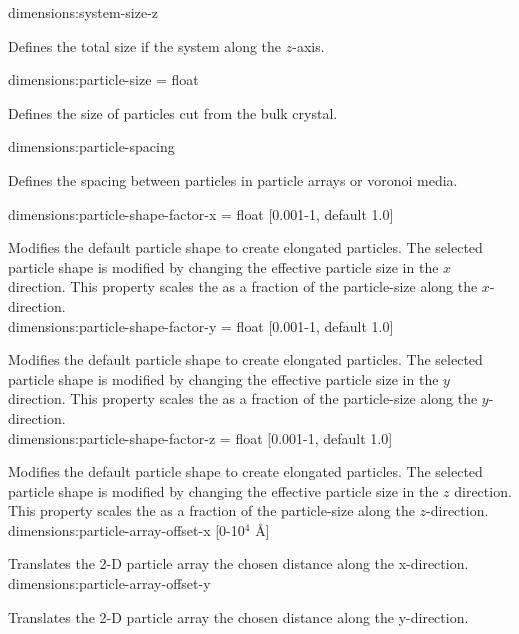 {\zicf dimensions:system-size-z} Defines the total size if the system along the $z$-axis.\\ \par

{\zicf dimensions:particle-size = float} Defines the size of particles cut from the bulk crystal.\\ \par

{\zicf dimensions:particle-spacing} Defines the spacing between particles in particle arrays or voronoi media.\\ \par


{\zicf dimensions:particle-shape-factor-x = float [0.001-1, default 1.0]} Modifies the default particle shape to create elongated particles. The selected particle shape is modified by changing the effective particle size in the $x$ direction. This property scales the as a fraction of the particle-size along the $x$-direction.\\

{\zicf dimensions:particle-shape-factor-y = float [0.001-1, default 1.0]} Modifies the default particle shape to create elongated particles. The selected particle shape is modified by changing the effective particle size in the $y$ direction. This property scales the as a fraction of the particle-size along the $y$-direction.\\

{\zicf dimensions:particle-shape-factor-z = float [0.001-1, default 1.0]} Modifies the default particle shape to create elongated particles. The selected particle shape is modified by changing the effective particle size in the $z$ direction. This property scales the as a fraction of the particle-size along the $z$-direction.\\

{\zicf dimensions:particle-array-offset-x [0-10$^4$ \AA]} Translates the 2-D particle array the chosen distance along the x-direction.\\

{\zicf dimensions:particle-array-offset-y}  Translates the 2-D particle array the chosen distance along the y-direction.\\

